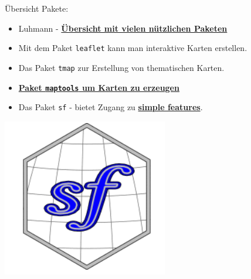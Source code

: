 \documentclass[ignorenonframetext,]{beamer}
\providecommand{\tightlist}{%
  \setlength{\itemsep}{0pt}\setlength{\parskip}{0pt}}
\begin{document}
\begin{frame}[fragile]{Übersicht Pakete:}

\begin{itemize}
\tightlist
\item
  Luhmann -
  \href{http://www.beltz.de/fileadmin/beltz/downloads/OnlinematerialienPVU/28090_Luhmann/Verwendete\%20Pakete.pdf}{\textbf{Übersicht
  mit vielen nützlichen Paketen}}
\item
  Mit dem Paket \texttt{leaflet} kann man interaktive Karten erstellen.
\item
  Das Paket \texttt{tmap} zur Erstellung von thematischen Karten.
\item
  \href{http://www.r-bloggers.com/tag/maptools/}{\textbf{Paket
  \texttt{maptools} um Karten zu erzeugen}}
\item
  Das Paket \texttt{sf} - bietet Zugang zu
  \href{https://de.wikipedia.org/wiki/Simple_Feature_Access}{\textbf{simple
  features}}.
\end{itemize}

\includegraphics{figure/logo_sf.PNG}

\end{frame}
\end{document}
